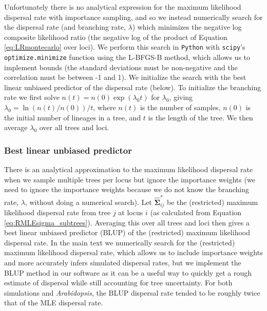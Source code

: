 \documentclass[12pt]{article}
\begin{document}
Unfortunately there is no analytical expression for the maximum likelihood dispersal rate with importance sampling, and so we instead numerically search for the dispersal rate (and branching rate, $\lambda$) which minimizes the negative log composite likelihood ratio (the negative log of the product of Equation \eqref{eq:LRmontecarlo} over loci).
We perform this search in \texttt{Python} with \texttt{scipy}'s \texttt{optimize.minimize} function \citep{2020SciPy-NMeth} using the L-BFGS-B method, which allows us to implement bounds (the standard deviations must be non-negative and the correlation must be between -1 and 1). 
We initialize the search with the best linear unbiased predictor of the dispersal rate (below).
To initialize the branching rate we first solve $n(t)=n(0)\exp(\lambda_0 t)$ for $\lambda_0$, giving $\lambda_0 = \ln(n(t)/n(0))/t$, where $n(t)$ is the number of samples, $n(0)$ is the initial number of lineages in a tree, and $t$ is the length of the tree.   
We then average $\lambda_0$ over all trees and loci.

\subsubsection*{Best linear unbiased predictor}

There is an analytical approximation to the maximum likelihood dispersal rate when we sample multiple trees per locus but ignore the importance weights (we need to ignore the importance weights because we do not know the branching rate, $\lambda$, without doing a numerical search).
Let $\widehat{\mathbf{\Sigma}}^*_{ij}$ be the (restricted) maximum likelihood dispersal rate from tree $j$ at locus $i$ (as calculated from Equation \ref{eq:RMLEsigma_subtrees}).
Averaging this over all trees and loci then gives a best linear unbiased predictor (BLUP) of the (restricted) maximum likelihood dispersal rate.
In the main text we numerically search for the (restricted) maximum likelihood dispersal rate, which allows us to include importance weights and more accurately infers simulated dispersal rates, but we implement the BLUP method in our software as it can be a useful way to quickly get a rough estimate of dispersal while still accounting for tree uncertainty.
For both simulations and \textit{Arabidopsis}, the BLUP dispersal rate tended to be roughly twice that of the MLE dispersal rate. 

\end{document}
